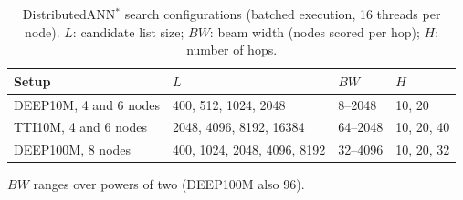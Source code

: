 \begin{table}[t]
\centering
\small
\caption{DistributedANN$^*$ search configurations (batched execution, 16 threads per node). $L$: candidate list size; $BW$: beam width (nodes scored per hop); $H$: number of hops.}
\label{tab:dann-config}
\begin{tabular}{llll}
\toprule
\textbf{Setup} & \textbf{$L$} & \textbf{$BW$} & \textbf{$H$} \\
\midrule
DEEP10M, 4 and 6 nodes & 400, 512, 1024, 2048        & 8--2048    & 10, 20 \\
TTI10M, 4 and 6 nodes  & 2048, 4096, 8192, 16384     & 64--2048   & 10, 20, 40 \\
DEEP100M, 8 nodes      & 400, 1024, 2048, 4096, 8192 & 32--4096   & 10, 20, 32 \\
\bottomrule
\end{tabular}
\par\smallskip
{\footnotesize $BW$ ranges over powers of two (DEEP100M also 96).}
\end{table}
